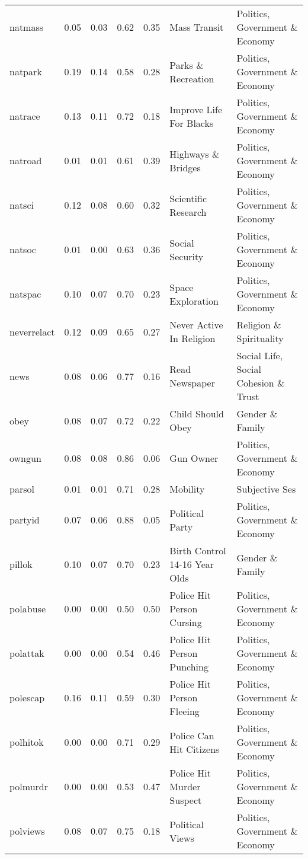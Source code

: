 \begin{longtable}{l|rrrrll}
natmass & 0.05 & 0.03 & 0.62 & 0.35 & Mass Transit & Politics, Government \& Economy \\ 
natpark & 0.19 & 0.14 & 0.58 & 0.28 & Parks \& Recreation & Politics, Government \& Economy \\ 
natrace & 0.13 & 0.11 & 0.72 & 0.18 & Improve Life For Blacks & Politics, Government \& Economy \\ 
natroad & 0.01 & 0.01 & 0.61 & 0.39 & Highways \& Bridges & Politics, Government \& Economy \\ 
natsci & 0.12 & 0.08 & 0.60 & 0.32 & Scientific Research & Politics, Government \& Economy \\ 
natsoc & 0.01 & 0.00 & 0.63 & 0.36 & Social Security & Politics, Government \& Economy \\ 
natspac & 0.10 & 0.07 & 0.70 & 0.23 & Space Exploration & Politics, Government \& Economy \\ 
neverrelact & 0.12 & 0.09 & 0.65 & 0.27 & Never Active In Religion & Religion \& Spirituality \\ 
news & 0.08 & 0.06 & 0.77 & 0.16 & Read Newspaper & Social Life, Social Cohesion \& Trust \\ 
obey & 0.08 & 0.07 & 0.72 & 0.22 & Child Should Obey & Gender \& Family \\ 
owngun & 0.08 & 0.08 & 0.86 & 0.06 & Gun Owner & Politics, Government \& Economy \\ 
parsol & 0.01 & 0.01 & 0.71 & 0.28 & Mobility & Subjective Ses \\ 
partyid & 0.07 & 0.06 & 0.88 & 0.05 & Political Party & Politics, Government \& Economy \\ 
pillok & 0.10 & 0.07 & 0.70 & 0.23 & Birth Control 14-16 Year Olds & Gender \& Family \\ 
polabuse & 0.00 & 0.00 & 0.50 & 0.50 & Police Hit Person Cursing & Politics, Government \& Economy \\ 
polattak & 0.00 & 0.00 & 0.54 & 0.46 & Police Hit Person Punching & Politics, Government \& Economy \\ 
polescap & 0.16 & 0.11 & 0.59 & 0.30 & Police Hit Person Fleeing & Politics, Government \& Economy \\ 
polhitok & 0.00 & 0.00 & 0.71 & 0.29 & Police Can Hit Citizens & Politics, Government \& Economy \\ 
polmurdr & 0.00 & 0.00 & 0.53 & 0.47 & Police Hit Murder Suspect & Politics, Government \& Economy \\ 
polviews & 0.08 & 0.07 & 0.75 & 0.18 & Political Views & Politics, Government \& Economy \\ 

\end{longtable}
